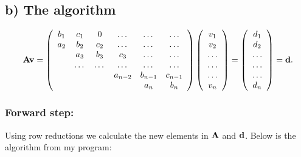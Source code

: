 \documentclass[norsk,a4paper,12pt]{article}
\begin{document}
\subsection*{b) The algorithm}

\begin{equation}
    {\bf Av} = \left(\begin{array}{cccccc}
                           b_1& c_1 & 0 &\dots   & \dots &\dots \\
                           a_2 & b_2 & c_2 &\dots &\dots &\dots \\
                           & a_3 & b_3 & c_3 & \dots & \dots \\
                           & \dots   & \dots &\dots   &\dots & \dots \\
                           &   &  &a_{n-2}  &b_{n-1}& c_{n-1} \\
                           &    &  &   &a_n & b_n \\
                      \end{array} \right)\left(\begin{array}{c}
                           v_1\\
                           v_2\\
                           \dots \\
                          \dots  \\
                          \dots \\
                           v_n\\
                      \end{array} \right)
  =\left(\begin{array}{c}
                           d_1\\
                           d_2\\
                           \dots \\
                           \dots \\
                           \dots \\
                           d_n\\
                      \end{array} \right) = {\bf d}.
\end{equation}


\subsubsection*{Forward step:}
Using row reductions we calculate the new elements in $\bf A$ and $\bf d$.
Below is the algorithm from my program:

\end{document}
